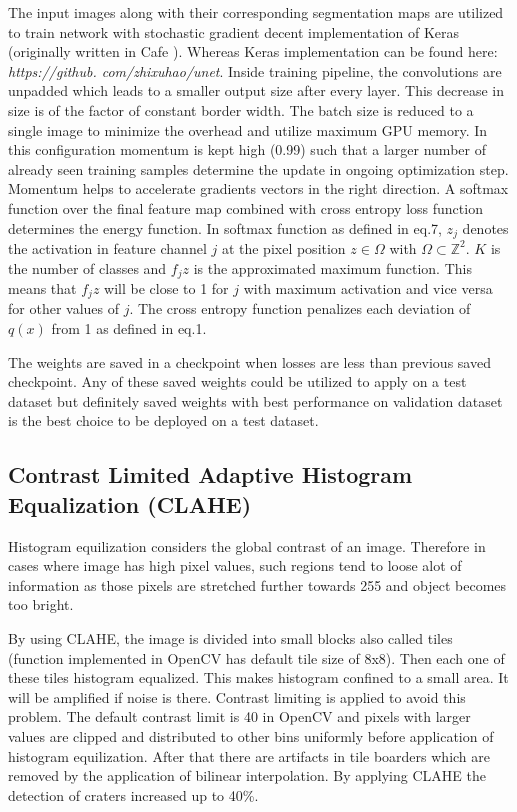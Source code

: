 \documentclass[11pt]{article}
\begin{document}
The input images along with their corresponding segmentation maps are utilized to train network with stochastic gradient decent implementation of Keras (originally written in Cafe \cite{ronneberger2015u}). Whereas Keras implementation can be found here:
\textit{https://github.
com/zhixuhao/unet}. Inside training pipeline, the convolutions are unpadded which leads to a smaller output size after every layer. This decrease in size is of the factor of constant border width. The batch size is reduced to a single image to minimize the overhead and utilize maximum GPU memory. In this configuration momentum is kept high (0.99) such that a larger number of already seen training samples determine the update in ongoing optimization step. Momentum helps to accelerate gradients vectors in the right direction. A softmax function over the final feature map combined with cross entropy loss function determines the energy function. In softmax function as defined in eq.7, $z_{j}$ denotes the activation in feature channel $j$ at the pixel position $z \in \Omega$ with $\Omega \subset \mathbb{Z}^{2}$. $K$ is the number of classes and $f_jz$ is the approximated maximum function. This means that $f_jz$ will be close to 1 for $j$ with maximum activation and vice versa for other values of $j$. The cross entropy function penalizes each deviation of $q(x)$ from 1 as defined in eq.1.

The weights are saved in a checkpoint when losses are less than previous saved checkpoint. Any of these saved weights could be utilized to apply on a test dataset but definitely saved weights with best performance on validation dataset is the best choice to be deployed on a test dataset.

\subsection{Contrast Limited Adaptive Histogram Equalization (CLAHE)}
Histogram equilization considers the global contrast of an image. Therefore in cases where image has high pixel values, such regions tend to loose alot of information as those pixels are stretched further towards 255 and object becomes too bright. 

By using CLAHE, the image is divided into small blocks also called tiles (function implemented in OpenCV has default tile size of 8x8). Then each one of these tiles histogram equalized. This makes histogram confined to a small area. It will be amplified if noise is there. Contrast limiting is applied to avoid this problem. The default contrast limit is 40 in OpenCV and pixels with larger values are clipped and distributed to other bins uniformly before application of histogram equilization. After that there are artifacts in tile boarders which are removed by the application of bilinear interpolation. By applying CLAHE the detection of craters increased up to 40\%. 
\end{document}
